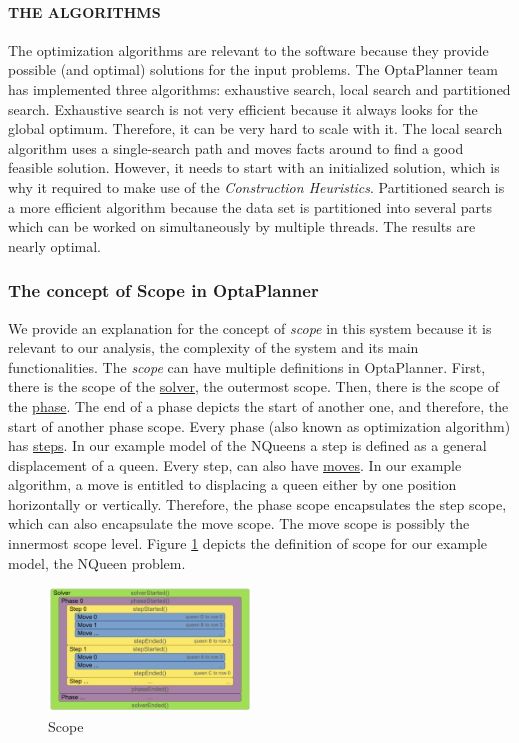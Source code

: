\paragraph{{\scriptsize THE ALGORITHMS}}
\label{par:algos}
The optimization algorithms are relevant to the software because they provide possible (and optimal) solutions for the input problems. The OptaPlanner team has implemented three algorithms: exhaustive search, local search and partitioned search. Exhaustive search is not very efficient because it always looks for the global optimum. Therefore, it can be very hard to scale with it. The local search algorithm uses a single-search path and moves facts around to find a good feasible solution. However, it needs to start with an initialized solution, which is why it required to make use of the \textit{Construction Heuristics}. Partitioned search is a more efficient algorithm because the data set is partitioned into several parts which can be worked on simultaneously by multiple threads. The results are nearly optimal.
\subsubsection{The concept of Scope in OptaPlanner}
We provide an explanation for the concept of \textit{scope} in this system because it is relevant to our analysis, the complexity of the system and its main functionalities. 
The \textit{scope} can have multiple definitions in OptaPlanner. First, there is the scope of the \underline{solver}, the outermost scope. Then, there is the scope of the \underline{phase}. The end of a phase depicts the start of another one, and therefore, the start of another phase scope. 
Every phase (also known as optimization algorithm) has \underline{steps}. In our example model of the NQueens a step is defined as a general displacement of a queen. Every step, can also have \underline{moves}. In our example algorithm, a move is entitled to displacing a queen either by one position horizontally or vertically. Therefore, the phase scope encapsulates the step scope, which can also encapsulate the move scope. The move scope is possibly the innermost scope level.
Figure \ref{fig:scope_fig} depicts the definition of scope for our example model, the NQueen problem.
\label{subsub:scope}
\begin{figure}[H]
    \centering
    \includegraphics[width=0.48\textwidth]{figures/step2/scope_overview.png}
    \caption{Scope}
    \label{fig:scope_fig}
\end{figure}